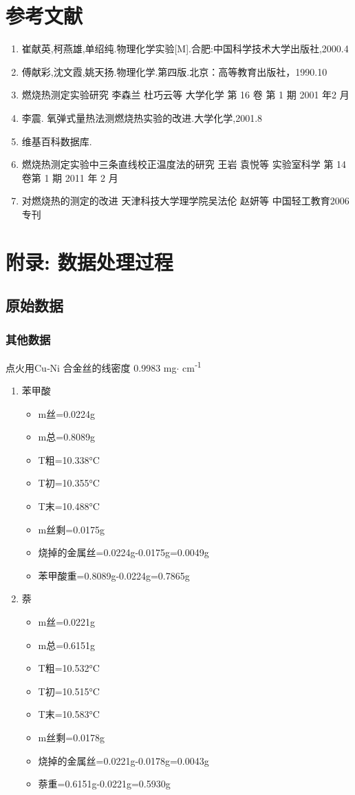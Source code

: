 \documentclass[11pt]{report}
\begin{document}
\part{参考文献}
\label{sec:orgc6f1e7d}
\begin{enumerate}
\item 崔献英,柯燕雄,单绍纯.物理化学实验[M].合肥:中国科学技术大学出版社,2000.4
\item 傅献彩,沈文霞,姚天扬.物理化学.第四版.北京：高等教育出版社，1990.10
\item 燃烧热测定实验研究 李森兰 杜巧云等 大学化学 第 16 卷 第 1 期 2001 年2 月
\item 李震. 氧弹式量热法测燃烧热实验的改进.大学化学,2001.8
\item 维基百科数据库.
\item 燃烧热测定实验中三条直线校正温度法的研究 王岩 袁悦等 实验室科学 第 14 卷第 1 期 2011 年 2 月
\item 对燃烧热的测定的改进 天津科技大学理学院吴法伦 赵妍等 中国轻工教育2006 专刊
\end{enumerate}
\part{附录: 数据处理过程}
\label{sec:org58417cf}
\chapter{原始数据}
\label{sec:orgde4f96c}
\section{其他数据}
\label{sec:orgbd01ac0}
点火用Cu‐Ni 合金丝的线密度 0.9983 mg\(\cdot\) cm\textsuperscript{‐1}
\begin{enumerate}
\item 苯甲酸
\label{sec:org75d240b}
\begin{itemize}
\item m丝=0.0224g
\item m总=0.8089g
\item T粗=10.338°C
\item T初=10.355°C
\item T末=10.488°C
\item m丝剩=0.0175g
\item 烧掉的金属丝=0.0224g-0.0175g=0.0049g
\item 苯甲酸重=0.8089g-0.0224g=0.7865g
\end{itemize}
\item 萘
\label{sec:orge6ec0bd}
\begin{itemize}
\item m丝=0.0221g
\item m总=0.6151g
\item T粗=10.532°C
\item T初=10.515°C
\item T末=10.583°C
\item m丝剩=0.0178g
\item 烧掉的金属丝=0.0221g-0.0178g=0.0043g
\item 萘重=0.6151g-0.0221g=0.5930g
\end{itemize}
\end{enumerate}
\end{document}
